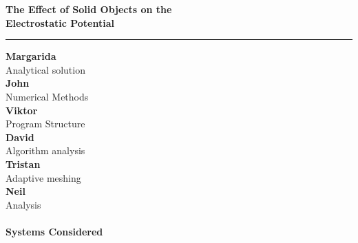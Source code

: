 \documentclass{report}
\begin{document}
\noindent \textbf{\Large The Effect of Solid Objects on the \\ Electrostatic Potential} \\

\hrule
\vspace{2cm}

\begin{outline}[enumerate]
\0
  \0 
  
  \1 \textbf{Margarida} \\
  	 Analytical solution \\
  	
  \1 {\bf John} \\
  	 Numerical Methods \\
  	
  \1 {\bf Viktor} \\
  	 Program Structure \\
  	
  \1 {\bf David} \\
  	 Algorithm analysis \\
  	
  \1 {\bf Tristan} \\
  	 Adaptive meshing \\
  	
  \1 {\bf Neil} \\
  	 Analysis \\ \\
  \0 {\large \bf Systems Considered} \\

\end{outline}
\end{document}
